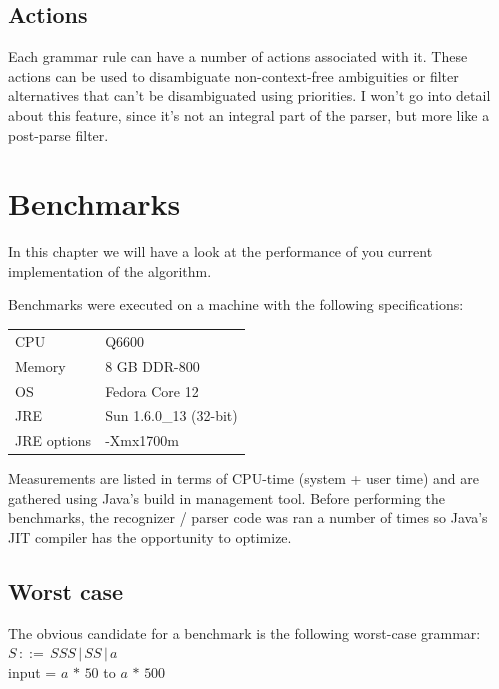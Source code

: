 \documentclass[a4paper,10pt]{article}
\begin{document}
\subsection{Actions}

Each grammar rule can have a number of actions associated with it. These actions can be used to disambiguate non-context-free ambiguities or filter alternatives that can't be disambiguated using priorities. I won't go into detail about this feature, since it's not an integral part of the parser, but more like a post-parse filter.

\section{Benchmarks}

In this chapter we will have a look at the performance of you current implementation of the algorithm.

Benchmarks were executed on a machine with the following specifications:
\begin{table}[H]
\centering
\begin{tabular}{ | p{6em} | p{9em} | }
 \hline
 CPU & Q6600 \\
 Memory & 8 GB DDR-800 \\
 OS & Fedora Core 12 \\
 JRE & Sun 1.6.0\_13 (32-bit) \\
 JRE options & -Xmx1700m \\
 \hline
\end{tabular}
\end{table}

Measurements are listed in terms of CPU-time (system + user time) and are gathered using Java's build in management tool. Before performing the benchmarks, the recognizer / parser code was ran a number of times so Java's JIT compiler has the opportunity to optimize.

\subsection{Worst case}

The obvious candidate for a benchmark is the following worst-case grammar:
$S\,::=\,SSS\,|\,SS\,|\,a$\\
input = $a\,*\,50$ to $a\,*\,500$
\end{document}
